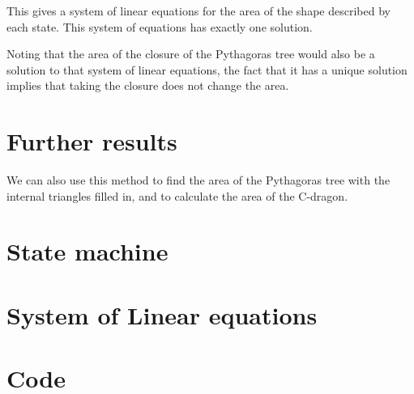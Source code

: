 \documentclass{article}
\newcommand{\bounding}{
\draw[tsty] (-2.5,1) -- (-1.5,0) -- (2.5,0) -- (3.5,1) -- (3.5,2.5) -- (2,4) -- (-1,4) -- (-2.5, 2.5) -- cycle;
}
\newcommand{\subt}[2]{
    \begin{scope}[yshift=1cm,rotate=45,scale=0.7071]
        #1
    \end{scope}
    \begin{scope}[xshift=0.5cm,yshift=1.5cm,rotate=-45,scale=0.7071]
        #2
    \end{scope}
}
\newcommand{\dup}[1]{\subt{#1}{#1}}
\newcommand{\tree}[1]{
    \fill[tsty] (0,0) -- (1,0) -- (1,1) -- (0,1) -- cycle;
    \ifthenelse{#1<2}{}{
        \dup{\tree{\the\numexpr#1-1}}
    }
}
\newcommand{\outertree}[1]{
    \fill[tsty] (0,0) -- (1,0) -- (1,1) -- (0,1) -- cycle;
    \ifthenelse{#1<2}{
        \bounding
    }{
        \dup{\outertree{\the\numexpr#1-1}}
    }
}
\newcommand{\depth}{5}%
\begin{document}
This gives a system of linear equations for the area of the shape described by each state. This system of equations has exactly one solution.

Noting that the area of the closure of the Pythagoras tree would also be a solution to that system of linear equations, the fact that it has a unique solution implies that taking the closure does not change the area.

\section{Further results}
We can also use this method to find the area of the Pythagoras tree with the internal triangles filled in, and to calculate the area of the C-dragon.

\appendix
\section{State machine}
\section{System of Linear equations}
\section{Code}



\end{document}

